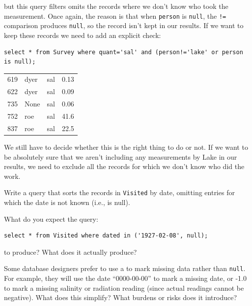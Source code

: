 \documentclass{book}
\begin{document}
but this query filters omits the records where we don't know who took
the measurement. Once again, the reason is that when \texttt{person} is
\texttt{null}, the \texttt{!=} comparison produces \texttt{null}, so the
record isn't kept in our results. If we want to keep these records we
need to add an explicit check:

\begin{verbatim}
select * from Survey where quant='sal' and (person!='lake' or person is null);
\end{verbatim}

\begin{tabular}{llll}
619 & dyer & sal & 0.13 \\
622 & dyer & sal & 0.09 \\
735 & None & sal & 0.06 \\
752 & roe & sal & 41.6 \\
837 & roe & sal & 22.5 \\
\end{tabular}

We still have to decide whether this is the right thing to do or not. If
we want to be absolutely sure that we aren't including any measurements
by Lake in our results, we need to exclude all the records for which we
don't know who did the work.

\begin{challenge}
  Write a query that sorts the records in \texttt{Visited} by date,
  omitting entries for which the date is not known (i.e., is null).
\end{challenge}

\begin{challenge}
  What do you expect the query:

\begin{verbatim}
select * from Visited where dated in ('1927-02-08', null);
\end{verbatim}

  to produce? What does it actually produce?
\end{challenge}

\begin{challenge}
  Some database designers prefer to use a
   to mark missing data
  rather than \texttt{null}. For example, they will use the date
  ``0000-00-00'' to mark a missing date, or -1.0 to mark a missing
  salinity or radiation reading (since actual readings cannot be
  negative). What does this simplify? What burdens or risks does it
  introduce?
\end{challenge}
\end{document}
